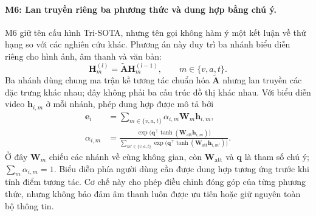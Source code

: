 \paragraph{M6: Lan truyền riêng ba phương thức và dung hợp bằng chú ý.}
M6 giữ tên cấu hình Tri-SOTA, nhưng tên gọi không hàm ý một kết luận về thứ hạng so với các nghiên cứu khác. Phương án này duy trì ba nhánh biểu diễn riêng cho hình ảnh, âm thanh và văn bản:
\begin{equation}
\mathbf H_m^{(l)}=\tilde{\mathbf A}\mathbf H_m^{(l-1)},\qquad m\in\{v,a,t\}.
\end{equation}
Ba nhánh dùng chung ma trận kề tương tác chuẩn hóa $\tilde{\mathbf A}$ nhưng lan truyền các đặc trưng khác nhau; đây không phải ba cấu trúc đồ thị khác nhau. Với biểu diễn video $\mathbf h_{i,m}$ ở mỗi nhánh, phép dung hợp được mô tả bởi
\begin{equation}
\begin{aligned}
\mathbf e_i&=\sum_{m\in\{v,a,t\}}\alpha_{i,m}\mathbf W_m\mathbf h_{i,m},\\
\alpha_{i,m}&=\frac{\exp\bigl(\mathbf q^\top\tanh(\mathbf W_{\text{att}}\mathbf h_{i,m})\bigr)}
{\sum_{m'\in\{v,a,t\}}\exp\bigl(\mathbf q^\top\tanh(\mathbf W_{\text{att}}\mathbf h_{i,m'})\bigr)}.
\end{aligned}
\end{equation}
Ở đây $\mathbf W_m$ chiếu các nhánh về cùng không gian, còn $\mathbf W_{\text{att}}$ và $\mathbf q$ là tham số chú ý; $\sum_m\alpha_{i,m}=1$. Biểu diễn phía người dùng cần được dung hợp tương ứng trước khi tính điểm tương tác. Cơ chế này cho phép điều chỉnh đóng góp của từng phương thức, nhưng không bảo đảm âm thanh luôn được ưu tiên hoặc giữ nguyên toàn bộ thông tin.

